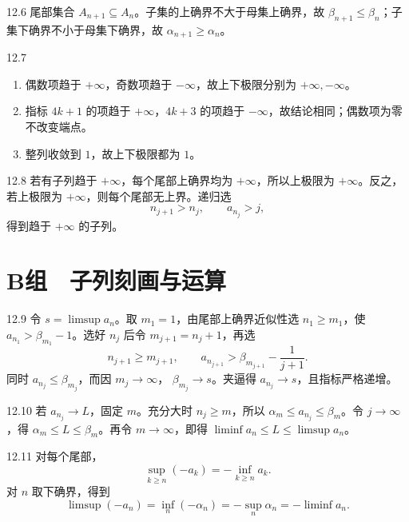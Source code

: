 \begin{solution}{12.6}
尾部集合 \(A_{n+1}\subseteq A_n\)。子集的上确界不大于母集上确界，故 \(\beta_{n+1}\le\beta_n\)；子集下确界不小于母集下确界，故 \(\alpha_{n+1}\ge\alpha_n\)。
\end{solution}

\begin{solution}{12.7}
\begin{enumerate}[label=(\arabic*)]
 \item 偶数项趋于 \(+\infty\)，奇数项趋于 \(-\infty\)，故上下极限分别为 \(+\infty,-\infty\)。
 \item 指标 \(4k+1\) 的项趋于 \(+\infty\)，\(4k+3\) 的项趋于 \(-\infty\)，故结论相同；偶数项为零不改变端点。
 \item 整列收敛到 \(1\)，故上下极限都为 \(1\)。
\end{enumerate}
\end{solution}

\begin{solution}{12.8}
若有子列趋于 \(+\infty\)，每个尾部上确界均为 \(+\infty\)，所以上极限为 \(+\infty\)。反之，若上极限为 \(+\infty\)，则每个尾部无上界。递归选
\[
 n_{j+1}>n_j,\qquad a_{n_j}>j,
\]
得到趋于 \(+\infty\) 的子列。
\end{solution}

\section*{B组　子列刻画与运算}

\begin{solution}{12.9}
令 \(s=\limsup a_n\)。取 \(m_1=1\)，由尾部上确界近似性选 \(n_1\ge m_1\)，使
\(a_{n_1}>\beta_{m_1}-1\)。选好 \(n_j\) 后令 \(m_{j+1}=n_j+1\)，再选
\[
 n_{j+1}\ge m_{j+1},\qquad
 a_{n_{j+1}}>\beta_{m_{j+1}}-\frac1{j+1}.
\]
同时 \(a_{n_j}\le\beta_{m_j}\)，而因 \(m_j\to\infty\)，
\(\beta_{m_j}\to s\)。夹逼得 \(a_{n_j}\to s\)，且指标严格递增。
\end{solution}

\begin{solution}{12.10}
若 \(a_{n_j}\to L\)，固定 \(m\)。充分大时 \(n_j\ge m\)，所以
\(\alpha_m\le a_{n_j}\le\beta_m\)。令 \(j\to\infty\)，得
\(\alpha_m\le L\le\beta_m\)。再令 \(m\to\infty\)，即得
\(\liminf a_n\le L\le\limsup a_n\)。
\end{solution}

\begin{solution}{12.11}
对每个尾部，
\[
 \sup_{k\ge n}(-a_k)=-\inf_{k\ge n}a_k.
\]
对 \(n\) 取下确界，得到
\[
 \limsup(-a_n)
 =\inf_n(-\alpha_n)
 =-\sup_n\alpha_n
 =-\liminf a_n.
\]
\end{solution}

